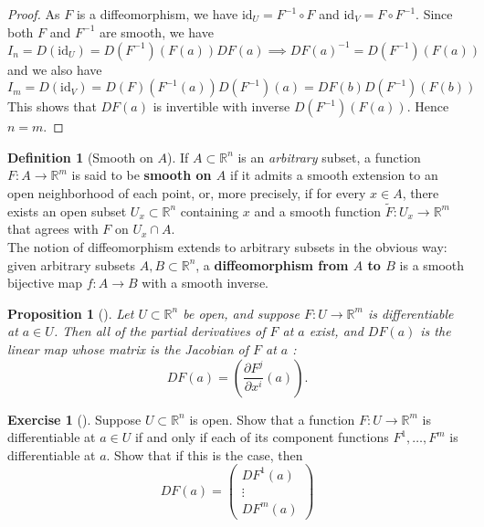 \documentclass[reqno]{amsart}
\theoremstyle{plain}%
\newtheorem{proposition}[theorem]{Proposition}
\theoremstyle{definition}
\newtheorem{definition}[theorem]{Definition}
\newtheorem{exercise}[theorem]{Exercise}
\theoremstyle{remark}
\newcommand{\id}{{\mathrm{id}}}
\begin{document}
        \begin{proof}
        As $F$ is a diffeomorphism, we have
        $\id_{U} = F^{-1} \circ F$ and
        $\id_{V} = F \circ F^{-1}$. Since both $F$ and $F^{-1}$ are smooth, we have
        \[
            I_n = D\left( \id_{U} \right) 
            = D \left( F^{-1} \right) \left( F(a) \right) 
            DF(a) \implies DF(a)^{-1} = D\left( F^{-1} \right) \left( F (a) \right) 
        \] 
        and we also have
        \[
        I_{m} = D \left( \id_V \right) 
        = D \left( F \right) \left( F^{-1}(a) \right) D \left( F^{-1} \right) (a)
        = DF (b) D\left( F^{-1} \right) \left( F(b) \right) 
        \] 
        This shows that
        $DF(a)$ is invertible with inverse
        $D\left( F^{-1} \right) \left( F(a) \right) $. Hence $n = m$.
        \end{proof}

        \begin{definition}[Smooth on $A$]
        If $A \subset \mathbb{R}^{n}$ is an \textit{arbitrary} subset, a function
        $F  \colon A \to \mathbb{R}^{m}$ is said to be \textbf{smooth on $A$} if it
        admits a smooth extension to an open neighborhood of each point, or, more
        precisely, if for every $x \in A$, there exists an open subset
        $U_x \subset \mathbb{R}^{n}$ containing $x$ and a smooth function
        $\tilde{F}  \colon U_x \to \mathbb{R}^{m}$ that agrees with
        $F$ on $U_x \cap A$.\\
        The notion of diffeomorphism extends to arbitrary subsets in the obvious
        way: given arbitrary subsets $A,B \subset \mathbb{R}^{n}$,
        a \textbf{diffeomorphism from $A$ to $B$} is a smooth bijective map
        $f  \colon A \to B$ with a smooth inverse.
        \end{definition}


        \begin{proposition}[]\label{diff-implies-partials-exist}
        Let $U \subset \mathbb{R}^{n}$ be open, and suppose $F  \colon U \to
        \mathbb{R}^{m}$ is differentiable at $a \in U$. Then all of the partial
        derivatives of $F$ at $a$ exist, and $DF(a)$ is the linear map whose matrix
        is the Jacobian of $F$ at $a$ :
        \[
        DF (a) = \left( \frac{\partial F^{j}}{\partial x^{i}}(a) \right).
        \] 
        \end{proposition}

        \begin{exercise}[]
        Suppose $U \subset \mathbb{R}^{n}$ is open. Show that a function
        $F  \colon U \to \mathbb{R}^{m}$ is differentiable at $a \in U$ if and only
        if each of its component functions $F^{1},\ldots, F^{m}$ is differentiable
        at $a$. Show that if this is the case, then
        \[
        DF(a) = \begin{pmatrix} 
            DF^{1}(a)\\
            \vdots \\
            DF^{m}(a)
        \end{pmatrix} 
        \] 
        \end{exercise}
\end{document}
